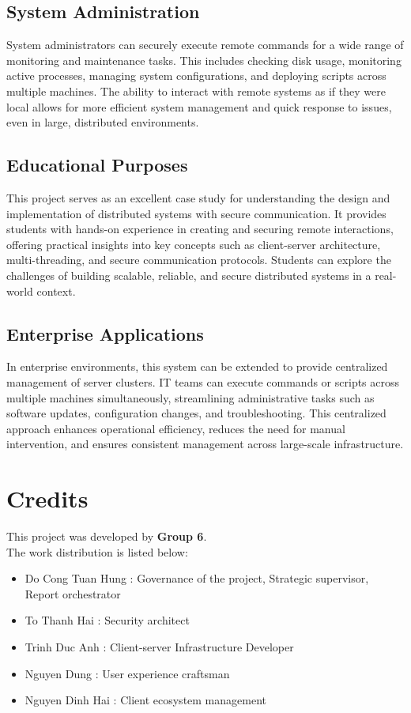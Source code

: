 \documentclass[12pt,a4paper]{report}
\begin{document}
\section{System Administration}
System administrators can securely execute remote commands for a wide range of monitoring and maintenance tasks. This includes checking disk usage, monitoring active processes, managing system configurations, and deploying scripts across multiple machines. The ability to interact with remote systems as if they were local allows for more efficient system management and quick response to issues, even in large, distributed environments.

\section{Educational Purposes}
This project serves as an excellent case study for understanding the design and implementation of distributed systems with secure communication. It provides students with hands-on experience in creating and securing remote interactions, offering practical insights into key concepts such as client-server architecture, multi-threading, and secure communication protocols. Students can explore the challenges of building scalable, reliable, and secure distributed systems in a real-world context.

\section{Enterprise Applications}
In enterprise environments, this system can be extended to provide centralized management of server clusters. IT teams can execute commands or scripts across multiple machines simultaneously, streamlining administrative tasks such as software updates, configuration changes, and troubleshooting. This centralized approach enhances operational efficiency, reduces the need for manual intervention, and ensures consistent management across large-scale infrastructure.


\chapter{Credits}
This project was developed by \textbf{Group 6}. \\ The work distribution is listed below: \\ 
\begin{itemize}
    \item Do Cong Tuan Hung \hspace{1 cm} : Governance of the project, Strategic supervisor, Report orchestrator
    \item To Thanh Hai \hspace{2,7 cm}: Security architect
    \item Trinh Duc Anh \hspace{2,5 cm}: Client-server Infrastructure Developer
    \item Nguyen Dung \hspace{2,8 cm}: User experience craftsman
    \item Nguyen Dinh Hai \hspace{2,13 cm}: Client ecosystem management
\end{itemize}
\end{document}
